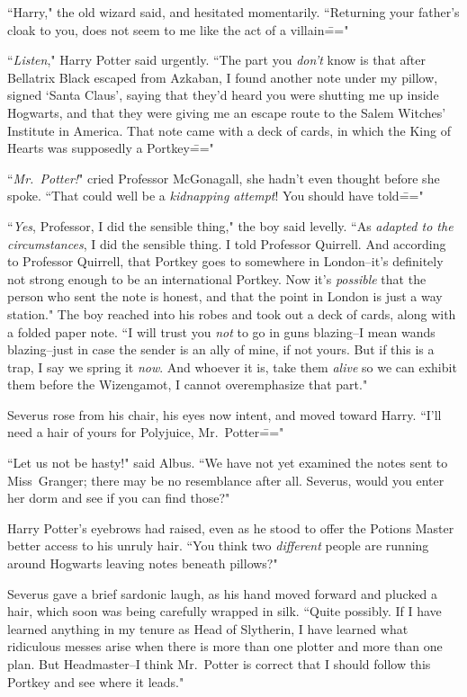 ``Harry," the old wizard said, and hesitated momentarily. ``Returning your father's cloak to you, does not seem to me like the act of a villain\==="

``\emph{Listen}," Harry Potter said urgently. ``The part you \emph{don't} know is that after Bellatrix Black escaped from Azkaban, I found another note under my pillow, signed `Santa Claus', saying that they'd heard you were shutting me up inside Hogwarts, and that they were giving me an escape route to the Salem Witches' Institute in America. That note came with a deck of cards, in which the King of Hearts was supposedly a Portkey\==="

``\emph{Mr.~Potter!}" cried Professor McGonagall, she hadn't even thought before she spoke. ``That could well be a \emph{kidnapping attempt}! You should have told\==="

``\emph{Yes}, Professor, I did the sensible thing," the boy said levelly. ``As \emph{adapted to the circumstances}, I did the sensible thing. I told Professor Quirrell. And according to Professor Quirrell, that Portkey goes to somewhere in London\---it's definitely not strong enough to be an international Portkey. Now it's \emph{possible} that the person who sent the note is honest, and that the point in London is just a way station." The boy reached into his robes and took out a deck of cards, along with a folded paper note. ``I will trust you \emph{not} to go in guns blazing\---I mean wands blazing\---just in case the sender is an ally of mine, if not yours. But if this is a trap, I say we spring it \emph{now}. And whoever it is, take them \emph{alive} so we can exhibit them before the Wizengamot, I cannot overemphasize that part."

Severus rose from his chair, his eyes now intent, and moved toward Harry. ``I'll need a hair of yours for Polyjuice, Mr.~Potter\==="

``Let us not be hasty!" said Albus. ``We have not yet examined the notes sent to Miss~Granger; there may be no resemblance after all. Severus, would you enter her dorm and see if you can find those?"

Harry Potter's eyebrows had raised, even as he stood to offer the Potions Master better access to his unruly hair. ``You think two \emph{different} people are running around Hogwarts leaving notes beneath pillows?"

Severus gave a brief sardonic laugh, as his hand moved forward and plucked a hair, which soon was being carefully wrapped in silk. ``Quite possibly. If I have learned anything in my tenure as Head of Slytherin, I have learned what ridiculous messes arise when there is more than one plotter and more than one plan. But Headmaster\---I think Mr.~Potter is correct that I should follow this Portkey and see where it leads."

